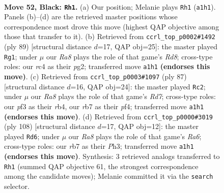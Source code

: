 \documentclass[11pt]{article}
\begin{document}
\clearpage

\begin{figure}[p]\centering
\begin{subfigure}{0.46\textwidth}\centering
\resizebox{\linewidth}{!}{%
\newchessgame
\chessboard[
  setfen={8/1R3p2/4pk2/p7/P1R1P3/5P1P/4K3/r7 b - - 1 52},
  showmover=false,
  pgfstyle=straightmove, color=movearrow, markmove={a1-h1}
]}
\caption{}
\end{subfigure}\hfill
\begin{subfigure}{0.46\textwidth}\centering
\resizebox{\linewidth}{!}{%
\newchessgame
\chessboard[
  setfen={8/1p6/1kp5/8/P2P2p1/2K5/2P2RP1/3r4 b - - 5 45},
  showmover=false,
  pgfstyle=straightmove, color=movearrow, markmove={d1-g1}
]}
\caption{}
\end{subfigure}
\\[4pt]
\begin{subfigure}{0.46\textwidth}\centering
\resizebox{\linewidth}{!}{%
\newchessgame
\chessboard[
  setfen={8/5p2/5kp1/8/1R3P1p/1P5P/3r2P1/6K1 b - - 4 44},
  showmover=false,
  pgfstyle=straightmove, color=movearrow, markmove={d2-c2}
]}
\caption{}
\end{subfigure}\hfill
\begin{subfigure}{0.46\textwidth}\centering
\resizebox{\linewidth}{!}{%
\newchessgame
\chessboard[
  setfen={8/6k1/R5p1/p3r1p1/P4p2/5P1P/6P1/6K1 w - - 6 55},
  showmover=false,
  pgfstyle=straightmove, color=movearrow, markmove={a6-d6}
]}
\caption{}
\end{subfigure}
\caption{\textbf{Move 52, Black: \texttt{Rh1}.} (a) Our position; Melanie plays \texttt{Rh1} (\texttt{a1h1}). Panels (b)--(d) are the retrieved master positions whose correspondence most drove this move (highest QAP objective among those that transfer to it). (b) Retrieved from \texttt{ccrl\_top\_p0002\#1492} (ply 89) [structural distance $d$=17, QAP obj=25]: the master played \texttt{Rg1}; under $\mu$ our \emph{Ra8} plays the role of that game's \emph{Rd8}; cross-type roles: our \emph{r}c4 as their \emph{p}g2; transferred move \texttt{a1h1} \textbf{(endorses this move)}. (c) Retrieved from \texttt{ccrl\_top\_p0003\#1097} (ply 87) [structural distance $d$=16, QAP obj=24]: the master played \texttt{Rc2}; under $\mu$ our \emph{Ra8} plays the role of that game's \emph{Rd7}; cross-type roles: our \emph{p}f3 as their \emph{r}b4, our \emph{r}b7 as their \emph{p}f4; transferred move \texttt{a1h1} \textbf{(endorses this move)}. (d) Retrieved from \texttt{ccrl\_top\_p0000\#3019} (ply 108) [structural distance $d$=17, QAP obj=12]: the master played \texttt{Rd6}; under $\mu$ our \emph{Ra8} plays the role of that game's \emph{Ra6}; cross-type roles: our \emph{r}b7 as their \emph{P}h3; transferred move \texttt{a1h1} \textbf{(endorses this move)}. Synthesis: 3 retrieved analogs transferred to \texttt{Rh1} (summed QAP objective 61, the strongest correspondence among the candidate moves); Melanie committed it via the \texttt{search} selector.}
\label{fig:thought-m103}
\end{figure}
\end{document}
